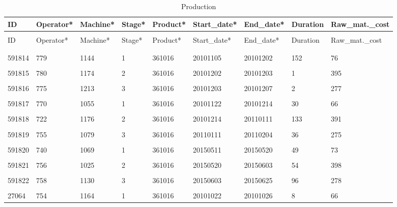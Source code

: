 \documentclass[letterpaper,12pt]{article}
\begin{document}
\begingroup
\renewcommand\arraystretch{0.5}
\begin{longtable}{p{1cm}p{1.5cm}p{1.5cm}p{1cm}p{1.5cm}p{1.8cm}p{1.6cm}p{1.3cm}p{2.2cm}}
        \caption{Production} \\
        ID & Operator* & Machine* & Stage* & Product* & Start\_date* & End\_date* & Duration & Raw\_mat.\_cost \\
        \endfirsthead \\
        ID & Operator* & Machine* & Stage* & Product* & Start\_date* & End\_date* & Duration & Raw\_mat.\_cost \\
        \endhead \\
        \hline \\
        591814 & 779 & 1144 & 1 & \color{red} 361016 & 20101105 & 20101202 & \color{red} 152 & 76 \\
        \hline \\
        591815 & 780 & 1174 & 2 & \color{red} 361016 & 20101202 & 20101203 & \color{red} 1 & 395 \\
        \hline \\
        591816 & 775 & 1213 & 3 & \color{red} 361016 & 20101203 & 20101207 & \color{red} 2 & 277 \\
        \hline \\
        591817 & 770 & 1055 & 1 & \color{red} 361016 & 20101122 & 20101214 & \color{red} 30 & 66 \\
        \hline \\
        591818 & 722 & \color{red} 1176 & 2 & \color{red} 361016 & 20101214 & 20110111 & \color{red} 133 & 391 \\
        \hline \\
        591819 & 755 & 1079 & 3 & \color{red} 361016 & 20110111 & 20110204 & \color{red} 36 & 275 \\
        \hline \\
        591820 & 740 & 1069 & 1 & \color{red} 361016 & 20150511 & 20150520 & \color{red} 49 & 73 \\
        \hline \\
        591821 & 756 & 1025 & 2 & \color{red} 361016 & 20150520 & 20150603 & \color{red} 54 & 398 \\
        \hline \\
        591822 & 758 & 1130 & 3 & \color{red} 361016 & 20150603 & 20150625 & \color{red} 96 & 278 \\
        \hline \\
        27064 & 754 & 1164 & 1 & \color{red} 361016 & 20101022 & 20101026 & \color{red} 8 & 66 \\

\end{longtable}
\end{document}

